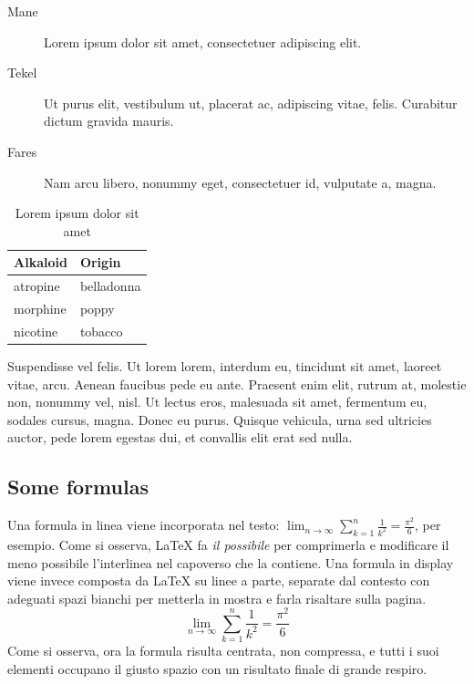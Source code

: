 \begin{description}
\item[Mane] Lorem ipsum dolor sit amet, consectetuer adipiscing elit.
\item[Tekel] Ut purus elit, vestibulum ut, placerat ac, adipiscing vitae, felis. Curabitur dictum gravida mauris.
\item[Fares] Nam arcu libero, nonummy eget, consectetuer
id, vulputate a, magna.
\end{description}

\begin{table}
\caption{Lorem ipsum dolor sit amet}
\centering
\begin{tabular}{ll}
\toprule
\textbf{Alkaloid} & \textbf{Origin} \\
\midrule
atropine & belladonna \\
morphine & poppy \\
nicotine & tobacco \\
\bottomrule
\end{tabular}
\end{table}

Suspendisse vel felis. Ut lorem lorem, interdum eu, tincidunt sit amet, laoreet vitae, arcu. Aenean faucibus pede eu ante. Praesent enim elit, rutrum at, molestie non, nonummy vel, nisl. Ut lectus eros, malesuada sit amet, fermentum eu, sodales cursus, magna. Donec eu purus. Quisque vehicula, urna sed ultricies auctor, pede lorem egestas dui, et convallis elit erat sed nulla.

\subsection*{Some formulas}

Una formula in linea viene incorporata nel testo: $\lim_{n \to \infty}\sum_{k=1}^n \frac{1}{k^2} = \frac{\pi^2}{6}$, per esempio. Come si osserva, \LaTeX{} fa \emph{il possibile} per comprimerla e modificare il meno possibile l'interlinea nel capoverso che la contiene.
Una formula in display viene invece composta da \LaTeX{} su linee a parte, separate dal contesto con adeguati spazi bianchi per metterla in mostra e farla risaltare sulla pagina.
\begin{equation}
\lim_{n \to \infty}\sum_{k=1}^n \frac{1}{k^2}= \frac{\pi^2}{6}
\end{equation}
Come si osserva, ora la formula risulta centrata, non compressa, e tutti i suoi elementi occupano il giusto spazio con un risultato finale di grande respiro.

